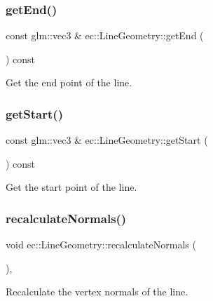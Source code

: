 \subsubsection{\texorpdfstring{get\+End()}{getEnd()}}
{\footnotesize\ttfamily const glm\+::vec3 \& ec\+::\+Line\+Geometry\+::get\+End (\begin{DoxyParamCaption}{ }\end{DoxyParamCaption}) const}



Get the end point of the line. 

\mbox{\label{classec_1_1_line_geometry_a68975a8bddebc31db08839ec6064a864}} 
\subsubsection{\texorpdfstring{get\+Start()}{getStart()}}
{\footnotesize\ttfamily const glm\+::vec3 \& ec\+::\+Line\+Geometry\+::get\+Start (\begin{DoxyParamCaption}{ }\end{DoxyParamCaption}) const}



Get the start point of the line. 

\mbox{\label{classec_1_1_line_geometry_a7a0b22930aa566c97d5f86f2a8246696}} 
\subsubsection{\texorpdfstring{recalculate\+Normals()}{recalculateNormals()}}
{\footnotesize\ttfamily void ec\+::\+Line\+Geometry\+::recalculate\+Normals (\begin{DoxyParamCaption}{ }\end{DoxyParamCaption})\hspace{0.3cm}{\ttfamily [override]}, {\ttfamily [virtual]}}



Recalculate the vertex normals of the line. 



